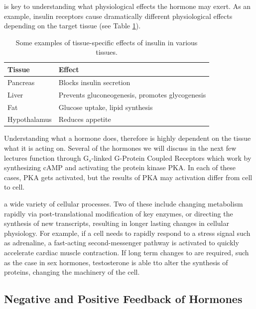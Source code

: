 \documentclass{tufte-handout}
\begin{document}
 is key to understanding what physiological effects the hormone may exert.  As an example, insulin receptors cause dramatically different physiological effects depending on the target tissue (see Table \ref{tab:insulin-tissue-roles}).

\begin{table}
  \centering
  \begin{tabular}{ll}
    \toprule
    Tissue & Effect \\
    \midrule
    Pancreas & Blocks insulin secretion \\
    Liver & Prevents gluconeogenesis, promotes glycogenesis\\
    Fat & Glucose uptake, lipid synthesis \\
    Hypothalamus & Reduces appetite \\
    \bottomrule
  \end{tabular}
  \caption{Some examples of tissue-specific effects of insulin in various tissues.}
  \label{tab:insulin-tissue-roles}
\end{table}

Understanding what a hormone does, therefore is highly dependent on the tissue what it is acting on.  Several of the hormones we will discuss in the next few lectures function through G$_{s}$-linked G-Protein Coupled Receptors which work by synthesizing cAMP and activating the protein kinase PKA.  In each of these cases, PKA gets activated, but the results of PKA may activation differ from cell to cell.

 a wide variety of cellular processes.  Two of these include changing metabolism rapidly via post-translational modification of key enzymes, or directing the synthesis of new transcripts, resulting in longer lasting changes in cellular physiology.  For example, if a cell needs to rapidly respond to a stress signal such as adrenaline, a fast-acting second-messenger pathway is activated to quickly accelerate cardiac muscle contraction.  If long term changes to  are required, such as the case in sex hormones, testosterone is able tto alter the synthesis of proteins, changing the machinery of the cell.


\subsection{Negative and Positive Feedback of Hormones}
\end{document}
